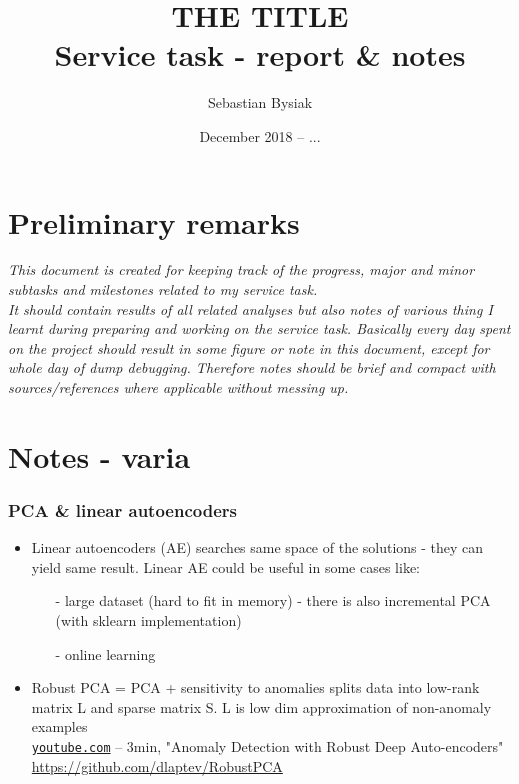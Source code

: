 \documentclass{article}
\title{ THE TITLE \\
Service task - report \& notes}
\author{Sebastian Bysiak}
\date{December 2018 -- ...}
\begin{document}
\maketitle


\section{Preliminary remarks}

\textit{
This document is created for keeping track of the progress, major and minor subtasks and milestones related to my service task.\\
It should contain results of all related analyses but also notes of various thing I learnt during preparing and working on the service task.
Basically every day spent on the project should result in some figure or note in this document, except for whole day of dump debugging. 
Therefore notes should be brief and compact with sources/references where applicable without messing up.
}


\section{Notes - varia}

\subsubsection{PCA \& linear autoencoders}
\begin{itemize}
\item Linear autoencoders (AE) searches same space of the solutions - they can yield same result.
Linear AE could be useful in some cases like: 
\begin{itemize}[topsep=0pt, itemsep=-2pt]
	\item[-] large dataset (hard to fit in memory) - there is also incremental PCA (with sklearn implementation)
	\item[-] online learning 
\end{itemize}
\item Robust PCA = PCA + sensitivity to anomalies
splits data into low-rank matrix L and sparse matrix S.
L is low dim approximation of non-anomaly examples \vspace{0pt} \\
\href{https://www.youtube.com/watch?v=eFQVvFMHlC8}{\texttt{youtube.com}} -- 3min, "Anomaly Detection with Robust Deep Auto-encoders"\\
\url{https://github.com/dlaptev/RobustPCA} 
\end{itemize}
\end{document}
